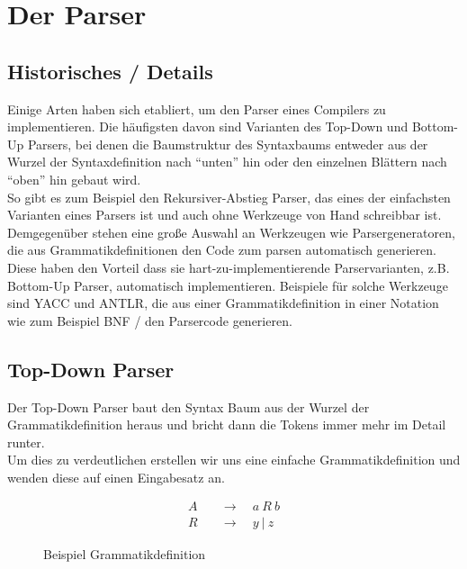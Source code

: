 \chapter{Der Parser}
\label{chap:theory:parser}

\section{Historisches / Details}

Einige Arten haben sich etabliert, um den Parser eines Compilers zu implementieren.
Die häufigsten davon sind Varianten des Top-Down und Bottom-Up Parsers, bei denen die Baumstruktur des Syntaxbaums entweder aus der Wurzel der Syntaxdefinition nach ``unten'' hin oder den einzelnen Blättern nach ``oben'' hin gebaut wird.\\
So gibt es zum Beispiel den Rekursiver-Abstieg Parser, das eines der einfachsten Varianten eines Parsers ist und auch ohne Werkzeuge von Hand schreibbar ist\cite{mossenbock:2024}.
Demgegenüber stehen eine große Auswahl an Werkzeugen wie Parsergeneratoren, die aus Grammatikdefinitionen den Code zum parsen automatisch generieren.
Diese haben den Vorteil dass sie hart-zu-implementierende Parservarianten, z.B. Bottom-Up Parser, automatisch implementieren.
Beispiele für solche Werkzeuge sind YACC und ANTLR, die aus einer Grammatikdefinition in einer Notation wie zum Beispiel BNF /  den Parsercode generieren.

\section{Top-Down Parser}

Der Top-Down Parser baut den Syntax Baum aus der Wurzel der Grammatikdefinition heraus und bricht dann die Tokens immer mehr im Detail runter\cite{meduna2007elements}.\\
Um dies zu verdeutlichen erstellen wir uns eine einfache Grammatikdefinition und wenden diese auf einen Eingabesatz an.\\
\begin{figure}[H]
  \begin{align*}
    A &\quad\rightarrow\quad a\ R\ b \\
    R &\quad\rightarrow\quad y\ |\ z
  \end{align*}
  \caption{Beispiel Grammatikdefinition}
  \label{fig:theory:parser:topdown:grammar}
\end{figure}

